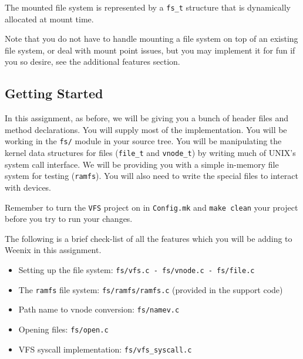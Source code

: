 The mounted file system is represented by a \texttt{fs\_t} structure that is dynamically allocated at mount time.

Note that you do not have to handle mounting a file system on top of an existing file system, or deal with mount point issues, but you may implement it for fun if you so desire, see the additional features section.

\subsection{Getting Started}

\begin{comment} %
The virtual file system (VFS) is an interface providing a clearly defined link between the operating system kernel and the various file systems. The VFS makes it simple to add many different file systems to your kernel and give them a single UNIX-style interface: with a VFS, you can play music by writing to \texttt{/dev/audio}, you can list your processes by reading \texttt{/proc/}, and things you don't want to see to \texttt{/dev/null}. Linux supports lots of different file systems -- e.g. users who don't want to copy all of their Windows files over to a Linux file system can keep them safely on an NTFS partition.
\end{comment}

In this assignment, as before, we will be giving you a bunch of header files and method declarations. You will supply most of the implementation. You will be working in the \texttt{fs/} module in your source tree. You will be manipulating the kernel data structures for files (\texttt{file\_t} and \texttt{vnode\_t}) by writing much of UNIX's system call interface. We will be providing you with a simple in-memory file system for testing (\texttt{ramfs}). You will also need to write the special files to interact with devices.

Remember to turn the \texttt{VFS} project on in \texttt{Config.mk} and \texttt{make clean} your project before you try to run your changes.

The following is a brief check-list of all the features which you will be adding to Weenix in this assignment.

\begin{itemize}
\item Setting up the file system: \texttt{fs/vfs.c - fs/vnode.c - fs/file.c}
\item The \texttt{ramfs} file system: \texttt{fs/ramfs/ramfs.c} (provided in the support code)
\item Path name to vnode conversion: \texttt{fs/namev.c}
\item Opening files: \texttt{fs/open.c}
\item VFS syscall implementation: \texttt{fs/vfs\_syscall.c}
\end{itemize}

